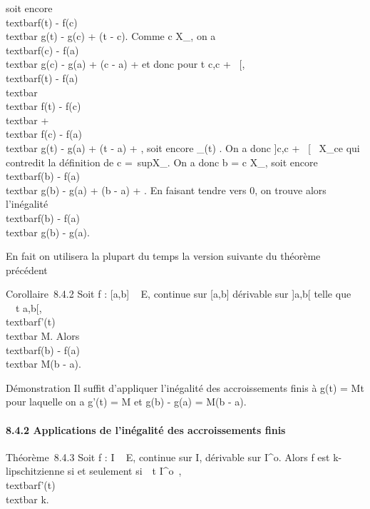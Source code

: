 \documentclass[]{article}
\begin{document}
soit encore \\textbar{}f(t) -
f(c)\\textbar{} \leq g(t) - g(c) + \epsilon(t - c). Comme c \in
X\_\epsilon, on a \\textbar{}f(c) -
f(a)\\textbar{} \leq g(c) - g(a) + \epsilon(c - a) + \epsilon et donc pour
t \in{]}c,c + \alpha~{[}, \\textbar{}f(t) -
f(a)\\textbar{} \leq\\textbar{} f(t) -
f(c)\\textbar{} +\\textbar{} f(c) -
f(a)\\textbar{} \leq g(t) - g(a) + \epsilon(t - a) + \epsilon, soit encore
\phi\_\epsilon(t) \leq \epsilon. On a donc {]}c,c + \alpha~{[}\subset~ X\_\epsilon ce qui
contredit la définition de c =\
supX\_\epsilon. On a donc b = c \in X\_\epsilon, soit encore
\\textbar{}f(b) - f(a)\\textbar{} \leq g(b) -
g(a) + \epsilon(b - a) + \epsilon. En faisant tendre \epsilon vers 0, on trouve alors
l'inégalité \\textbar{}f(b) -
f(a)\\textbar{} \leq g(b) - g(a).

En fait on utilisera la plupart du temps la version suivante du théorème
précédent

Corollaire~8.4.2 Soit f : {[}a,b{]} \rightarrow~ E, continue sur {[}a,b{]}
dérivable sur {]}a,b{[} telle que \forall~~t
\in{]}a,b{[}, \\textbar{}f'(t)\\textbar{} \leq
M. Alors \\textbar{}f(b) - f(a)\\textbar{}
\leq M(b - a).

Démonstration Il suffit d'appliquer l'inégalité des accroissements finis
à g(t) = Mt pour laquelle on a g'(t) = M et g(b) - g(a) = M(b - a).

\paragraph{8.4.2 Applications de l'inégalité des accroissements finis}

Théorème~8.4.3 Soit f : I \rightarrow~ E, continue sur I, dérivable sur
I^o. Alors f est k-lipschitzienne si et seulement
si~\forall~t \in I^o~,
\\textbar{}f'(t)\\textbar{} \leq k.
\end{document}
